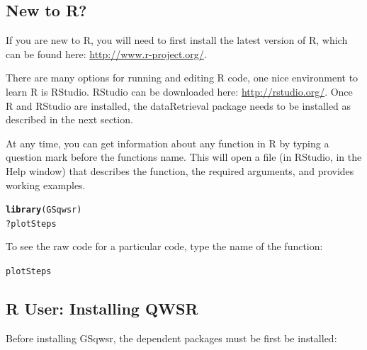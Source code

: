 \documentclass[a4paper,11pt]{article}\usepackage[]{graphicx}\usepackage[]{color}
\makeatletter
\newcommand{\hlopt}[1]{\textcolor[rgb]{0,0,0}{#1}}%
\newcommand{\hlstd}[1]{\textcolor[rgb]{0.345,0.345,0.345}{#1}}%
\newcommand{\hlkwd}[1]{\textcolor[rgb]{0.737,0.353,0.396}{\textbf{#1}}}%
\newenvironment{kframe}{%
 \def\at@end@of@kframe{}%
 \ifinner\ifhmode%
  \def\at@end@of@kframe{\end{minipage}}%
  \begin{minipage}{\columnwidth}%
 \fi\fi%
 \def\FrameCommand##1{\hskip\@totalleftmargin \hskip-\fboxsep
 \colorbox{shadecolor}{##1}\hskip-\fboxsep
     \hskip-\linewidth \hskip-\@totalleftmargin \hskip\columnwidth}%
 \MakeFramed {\advance\hsize-\width
   \@totalleftmargin\z@ \linewidth\hsize
   \@setminipage}}%
 {\par\unskip\endMakeFramed%
 \at@end@of@kframe}
\newenvironment{knitrout}{}{} %
\makeatother
\begin{document}
\subsection{New to R?}
If you are new to R, you will need to first install the latest version of R, which can be found here: \url{http://www.r-project.org/}.

There are many options for running and editing R code, one nice environment to learn R is RStudio. RStudio can be downloaded here: \url{http://rstudio.org/}. Once R and RStudio are installed, the dataRetrieval package needs to be installed as described in the next section.

At any time, you can get information about any function in R by typing a question mark before the functions name.  This will open a file (in RStudio, in the Help window) that describes the function, the required arguments, and provides working examples.

\begin{knitrout}
\color{fgcolor}\begin{kframe}
\begin{alltt}
\hlkwd{library}\hlstd{(GSqwsr)}
\hlopt{?}\hlstd{plotSteps}
\end{alltt}
\end{kframe}
\end{knitrout}

To see the raw code for a particular code, type the name of the function:
\begin{knitrout}
\color{fgcolor}\begin{kframe}
\begin{alltt}
\hlstd{plotSteps}
\end{alltt}
\end{kframe}
\end{knitrout}

\subsection{R User: Installing QWSR}
Before installing GSqwsr, the dependent packages must be first be installed:
\end{document}
